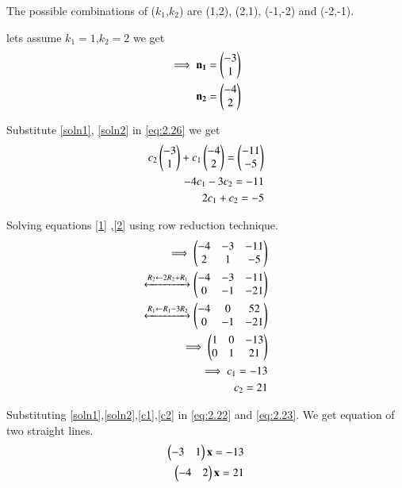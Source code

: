 \documentclass[journal,12pt,twocolumn]{IEEEtran}
\begin{document}
The possible combinations of ($k_1$,$k_2$) are (1,2), (2,1), (-1,-2) and (-2,-1).

lets assume $k_1=1$,$k_2=2$ we get
\begin{align}
    \implies\mathbf{n_1}=\begin{pmatrix}-3\\1\end{pmatrix}\label{soln1}\\
    \mathbf{n_2}=\begin{pmatrix}-4\\2\end{pmatrix}\label{soln2}
\end{align}

Substitute \eqref{soln1}, \eqref{soln2} in \eqref{eq:2.26} we get 
\begin{align}
    c_2\begin{pmatrix}-3\\1\end{pmatrix}+c_1\begin{pmatrix}-4\\2\end{pmatrix}=\begin{pmatrix} -11\\ -5\end{pmatrix}\\
    -4c_1-3c_2=-11\label{1}\\
    2c_1+c_2=-5\label{2}
\end{align}

Solving equations \eqref{1} ,\eqref{2} using row reduction technique.
\begin{align}
    \implies\begin{pmatrix}-4 & -3 & -11\\2 & 1 & -5\end{pmatrix}\\
    \xleftrightarrow[]{R_2\leftarrow 2R_2+R_1}\begin{pmatrix}-4 & -3 & -11\\0 & -1 & -21\end{pmatrix}\\
    \xleftrightarrow[]{R_1\leftarrow R_1-3R_2}\begin{pmatrix}-4 & 0 & 52\\0 & -1 & -21\end{pmatrix}\\
    \implies\begin{pmatrix}1 & 0 & -13\\0 & 1 & 21\end{pmatrix}\\
    \implies c_1=-13\label{c1}\\
    c_2=21\label{c2}
\end{align}

Substituting \eqref{soln1},\eqref{soln2},\eqref{c1},\eqref{c2} in \eqref{eq:2.22} and \eqref{eq:2.23}. We get equation of two straight lines.
\begin{align}
    \begin{pmatrix}-3 & 1\end{pmatrix}\mathbf{x}=-13\\
    \begin{pmatrix}-4 & 2\end{pmatrix}\mathbf{x}=21
\end{align}
\end{document}
